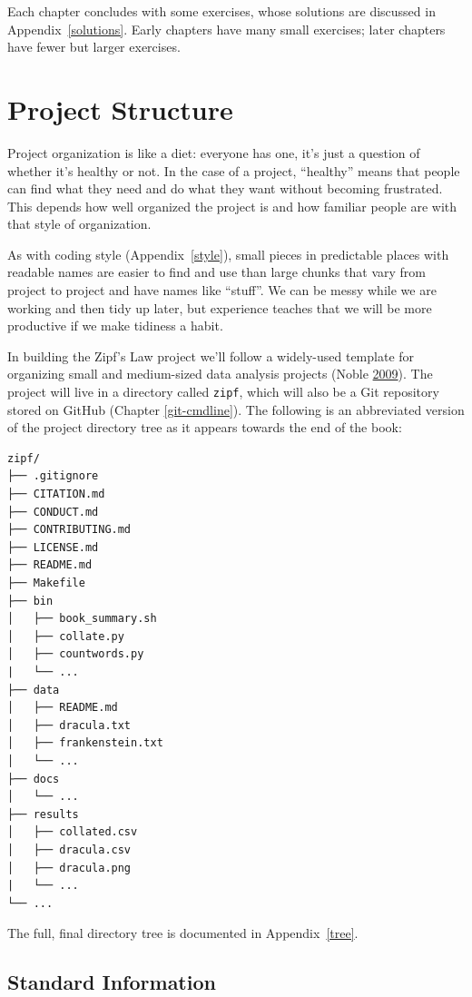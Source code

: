 \documentclass[
]{krantz}
\begin{document}
Each chapter concludes with some exercises,
whose solutions are discussed in Appendix~\ref{solutions}.
Early chapters have many small exercises;
later chapters have fewer but larger exercises.

\hypertarget{intro-structure}{%
\section{Project Structure}\label{intro-structure}}

Project organization is like a diet:
everyone has one,
it's just a question of whether it's healthy or not.
In the case of a project,
``healthy'' means that people can find what they need and do what they want without becoming frustrated.
This depends how well organized the project is
and how familiar people are with that style of organization.

As with coding style (Appendix~\ref{style}),
small pieces in predictable places with readable names are easier to find and use
than large chunks that vary from project to project and have names like ``stuff''.
We can be messy while we are working and then tidy up later,
but experience teaches that we will be more productive if we make tidiness a habit.

In building the Zipf's Law project we'll follow
a widely-used template
for organizing small and medium-sized data analysis projects (Noble \protect\hyperlink{ref-Nobl2009}{2009}).
The project will live in a directory called \texttt{zipf},
which will also be a Git repository stored on GitHub (Chapter \ref{git-cmdline}).
The following is an abbreviated version of the project directory tree
as it appears towards the end of the book:

\begin{verbatim}
zipf/
├── .gitignore
├── CITATION.md
├── CONDUCT.md
├── CONTRIBUTING.md   
├── LICENSE.md   
├── README.md
├── Makefile   
├── bin   
│   ├── book_summary.sh   
│   ├── collate.py   
│   ├── countwords.py   
|   └── ...    
├── data
│   ├── README.md   
│   ├── dracula.txt  
│   ├── frankenstein.txt  
│   └── ...   
├── docs
│   └── ...
├── results
│   ├── collated.csv
│   ├── dracula.csv
│   ├── dracula.png
|   └── ...
└── ...
\end{verbatim}

The full, final directory tree is documented in Appendix~\ref{tree}.

\hypertarget{intro-boilerplate}{%
\subsection{Standard Information}\label{intro-boilerplate}}
\end{document}
